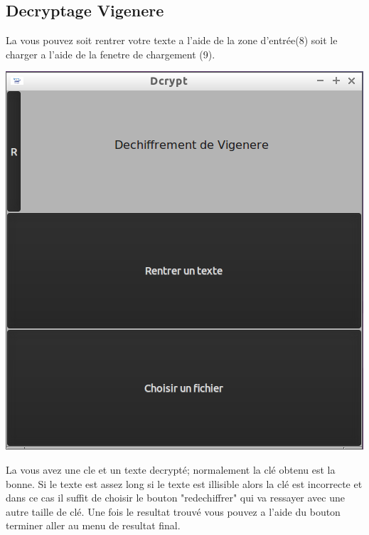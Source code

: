 \documentclass[a4]{article}
\begin{document}
		\subsection{Decryptage Vigenere}
			La vous pouvez soit rentrer votre texte a l'aide de la zone d'entrée(8)
 			soit le charger a l'aide de la fenetre de chargement (9).
			\begin{center}\includegraphics[scale=0.4]{14.png}\end{center}
			La vous avez une cle et un texte decrypté; normalement la clé obtenu est la bonne.
 			Si le texte est assez long si le texte est illisible alors la clé est incorrecte et
 			 dans ce cas il suffit de choisir le bouton "redechiffrer" qui va ressayer avec une 
 			 autre taille de clé. Une fois le resultat trouvé vous pouvez a l'aide du bouton 
			 terminer aller au menu de resultat final.  
\end{document}
